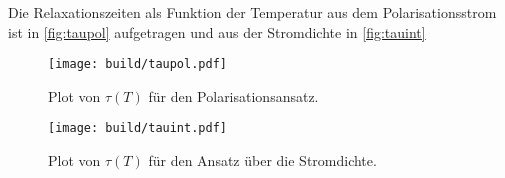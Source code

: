 Die Relaxationszeiten als Funktion der Temperatur aus dem Polarisationsstrom ist in \autoref{fig:taupol} aufgetragen und aus der Stromdichte in \autoref{fig:tauint} 
\begin{figure}[H]
    \centering
    \texttt{[image: build/taupol.pdf]}
    \caption{Plot von $\tau(T)$ für den Polarisationsansatz.}
    \label{fig:taupol}
\end{figure}
\begin{figure}[H]
    \centering
    \texttt{[image: build/tauint.pdf]}
    \caption{Plot von $\tau(T)$ für den Ansatz über die Stromdichte.}
    \label{fig:tauint}
\end{figure}